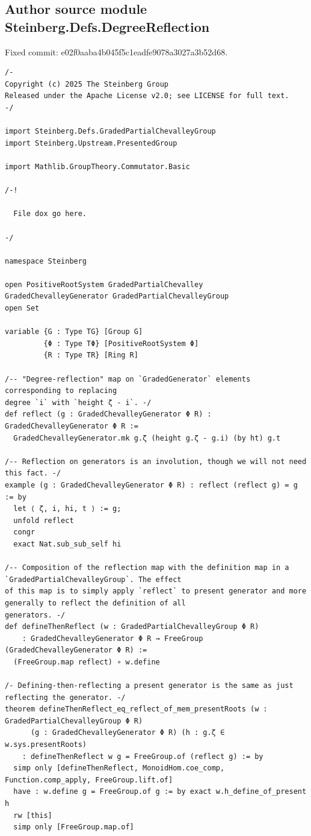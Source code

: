 \documentclass[10pt,a4paper]{article}
\begin{document}
\subsection*{Author source module Steinberg.Defs.DegreeReflection}
\noindent Fixed commit: e02f0aaba4b045f5c1eadfe9078a3027a3b52d68.
\begin{Verbatim}
/-
Copyright (c) 2025 The Steinberg Group
Released under the Apache License v2.0; see LICENSE for full text.
-/

import Steinberg.Defs.GradedPartialChevalleyGroup
import Steinberg.Upstream.PresentedGroup

import Mathlib.GroupTheory.Commutator.Basic

/-!

  File dox go here.

-/

namespace Steinberg

open PositiveRootSystem GradedPartialChevalley GradedChevalleyGenerator GradedPartialChevalleyGroup
open Set

variable {G : Type TG} [Group G]
         {Φ : Type TΦ} [PositiveRootSystem Φ]
         {R : Type TR} [Ring R]

/-- "Degree-reflection" map on `GradedGenerator` elements corresponding to replacing
degree `i` with `height ζ - i`. -/
def reflect (g : GradedChevalleyGenerator Φ R) : GradedChevalleyGenerator Φ R :=
  GradedChevalleyGenerator.mk g.ζ (height g.ζ - g.i) (by ht) g.t

/-- Reflection on generators is an involution, though we will not need this fact. -/
example (g : GradedChevalleyGenerator Φ R) : reflect (reflect g) = g := by
  let ⟨ ζ, i, hi, t ⟩ := g;
  unfold reflect
  congr
  exact Nat.sub_sub_self hi

/-- Composition of the reflection map with the definition map in a `GradedPartialChevalleyGroup`. The effect
of this map is to simply apply `reflect` to present generator and more generally to reflect the definition of all
generators. -/
def defineThenReflect (w : GradedPartialChevalleyGroup Φ R)
    : GradedChevalleyGenerator Φ R → FreeGroup (GradedChevalleyGenerator Φ R) :=
  (FreeGroup.map reflect) ∘ w.define

/- Defining-then-reflecting a present generator is the same as just reflecting the generator. -/
theorem defineThenReflect_eq_reflect_of_mem_presentRoots (w : GradedPartialChevalleyGroup Φ R)
      (g : GradedChevalleyGenerator Φ R) (h : g.ζ ∈ w.sys.presentRoots)
    : defineThenReflect w g = FreeGroup.of (reflect g) := by
  simp only [defineThenReflect, MonoidHom.coe_comp, Function.comp_apply, FreeGroup.lift.of]
  have : w.define g = FreeGroup.of g := by exact w.h_define_of_present h
  rw [this]
  simp only [FreeGroup.map.of]


\end{Verbatim}
\end{document}
